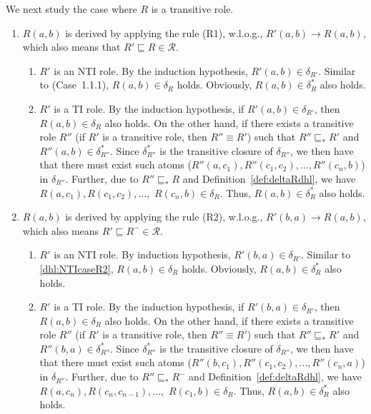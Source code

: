 \documentclass[final,1p,times]{elsarticle}
\begin{document}
We next study the case where $R$ is a transitive role.

\begin{enumerate}[leftmargin=12ex,label=Case~2.\arabic*, ref=Case~2.\arabic*]
\item $R(a,b)$ is derived by applying the rule (R1), w.l.o.g., $R'(a,b)\rightarrow R(a,b)$,
    which also means that $R'\sqsubseteq R\in\mathcal{R}$.\label{dhl:TcaseR1}
    \begin{enumerate}[leftmargin=8ex,label=Case~2.1.\arabic*]
    \item $R'$ is an NTI role. By the induction hypothesis, $R'(a,b)\in\delta_{R'}$.
        Similar to (Case~1.1.1), $R(a,b)\in\delta_{R}$ holds.
        Obviously, $R(a,b)\in\delta_{R}^*$ also holds.

    \item $R'$ is a TI role. By the induction hypothesis, if $R'(a,b)\in\delta_{R'}$,
        then $R(a,b)\in\delta_R$ also holds. On the other hand, if there exists a transitive role
        $R''$ (if $R'$ is a transitive role, then $R''\equiv R'$) such that
        $R''\sqsubseteq_* R'$ and $R''(a,b)\in\delta_{R''}^*$. Since $\delta_{R''}^*$ is
        the transitive closure of $\delta_{R''}$, we then have that there must
        exist such atoms ($R''(a,c_1),R''(c_1,c_2),...,R''(c_n,b)$) in $\delta_{R''}$.
        Further, due to $R''\sqsubseteq_* R$ and Definition~\ref{def:deltaRdhl},
        we have $R(a,c_1),R(c_1,c_2),...,$ $R(c_n,b)\in\delta_{R}$. Thus, $R(a,b)\in\delta_{R}^*$
        also holds.
    \end{enumerate}

\item $R(a,b)$ is derived by applying the rule (R2), w.l.o.g., $R'(b,a)\rightarrow R(a,b)$,
    which also means $R'\sqsubseteq R^-\in\mathcal{R}$.\label{dhl:TcaseR2}
    \begin{enumerate}[leftmargin=8ex,label=Case~2.2.\arabic*]
    \item $R'$ is an NTI role. By induction hypothesis, $R'(b,a)\in\delta_{R'}$.
        Similar to \ref{dhl:NTIcaseR2}, $R(a,b)\in\delta_{R}$ holds.
        Obviously, $R(a,b)\in\delta_{R}^*$ also holds.

    \item $R'$ is a TI role. By the induction hypothesis, if $R'(b,a)\in\delta_{R'}$,
        then $R(a,b)\in\delta_R$ also holds. On the other hand, if there exists a transitive role
        $R''$ (if $R'$ is a transitive role, then $R''\equiv R'$) such that
        $R''\sqsubseteq_* R'$ and $R''(b,a)\in\delta_{R''}^*$. Since $\delta_{R''}^*$ is
        the transitive closure of $\delta_{R''}$, we then have that there must
        exist such atoms ($R''(b,c_1),R''(c_1,c_2),...,R''(c_n,a)$) in $\delta_{R''}$.
        Further, due to $R''\sqsubseteq_* R^-$ and Definition~\ref{def:deltaRdhl},
        we have $R(a,c_n),R(c_n,c_{n-1}),...,$ $R(c_1,b)\in\delta_{R}$. Thus, $R(a,b)\in\delta_{R}^*$
        also holds.
    \end{enumerate}


\end{enumerate}
\end{document}

